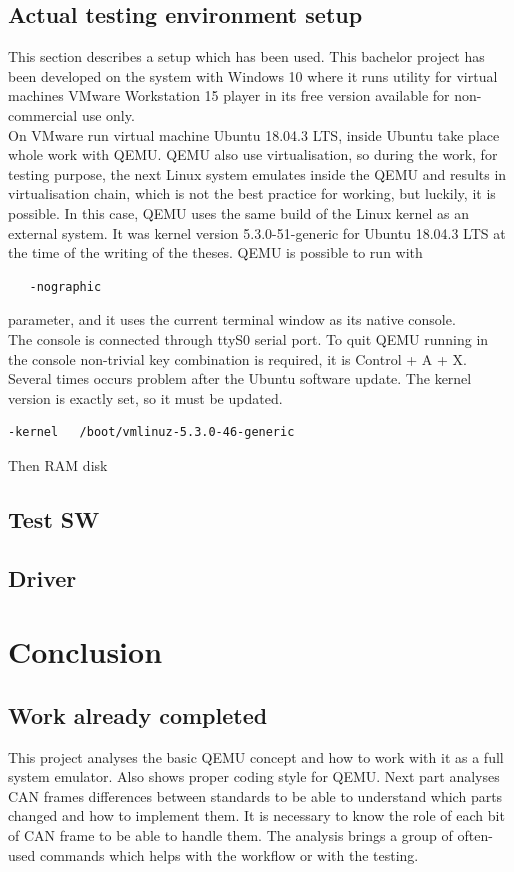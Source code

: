 \documentclass{ctuthesis}
\begin{document}
 \section{Actual testing environment setup}
  This section describes a setup which has been used. This bachelor project has been developed on the system with Windows 10 where it runs utility for virtual machines VMware  Workstation 15 player in its free version available for non-commercial use only. \cite{vmware} \\
  On VMware run virtual machine Ubuntu 18.04.3 LTS, \cite{ubuntu} inside Ubuntu take place whole work with QEMU. QEMU also use virtualisation, so during the work, for testing purpose, the next Linux system emulates inside the QEMU and results in virtualisation chain, which is not the best practice for working, but luckily, it is possible. In this case, QEMU uses the same build of the Linux kernel as an external system. It was kernel version 5.3.0-51-generic for Ubuntu 18.04.3 LTS at the time of the writing of the theses. QEMU is possible to run with
  \begin{verbatim}   -nographic\end{verbatim}
  parameter, and it uses the current terminal window as its native console. \\
  The console is connected through ttyS0 serial port. To quit QEMU running in the console non-trivial key combination is required, it is Control + A + X. Several times occurs problem after the Ubuntu software update. The kernel version is exactly set, so it must be updated.
  \begin{verbatim}-kernel   /boot/vmlinuz-5.3.0-46-generic\end{verbatim}
  Then RAM disk 
 \section{Test SW}
 
 \section{Driver}
 
\chapter{Conclusion}

 \section{Work already completed}
  This project analyses the basic QEMU concept and how to work with it as a full system emulator. Also shows proper coding style for QEMU.  Next part analyses CAN frames differences between standards to be able to understand which parts changed and how to implement them. It is necessary to know the role of each bit of CAN frame to be able to handle them. The analysis brings a group of often-used commands which helps with the workflow or with the testing.
 
\end{document}
